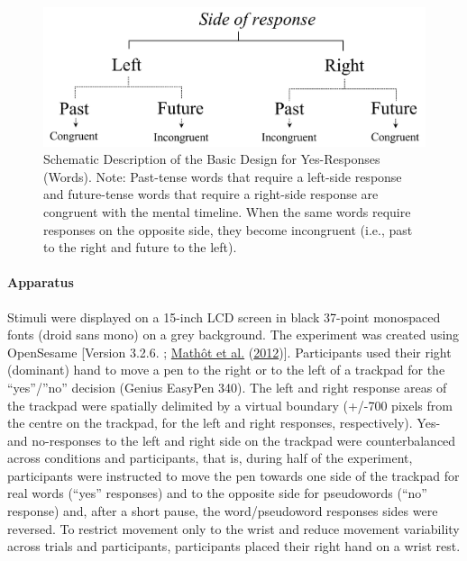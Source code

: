 \documentclass[
  a4paper,12pt,twoside,onecolumn,openright,final,oldfontcommands]{memoir}
\begin{document}
\begin{figure}[htbp!]

{\centering \includegraphics[width=0.8\linewidth]{figures/chap-3-fig1} 

}

\caption{Schematic Description of the Basic Design for Yes-Responses (Words). Note: Past-tense words that require a left-side response and future-tense words that require a right-side response are congruent with the mental timeline. When the same words require responses on the opposite side, they become incongruent (i.e., past to the right and future to the left).}\label{fig:chap-3-fig1}
\end{figure}

\hypertarget{apparatus}{%
\paragraph{Apparatus}\label{apparatus}}

Stimuli were displayed on a 15-inch LCD screen in black 37-point monospaced fonts (droid sans mono) on a grey background. The experiment was created using OpenSesame {[}Version 3.2.6. ; \protect\hyperlink{ref-mathot_opensesame_2012}{Mathôt et al.} (\protect\hyperlink{ref-mathot_opensesame_2012}{2012}){]}. Participants used their right (dominant) hand to move a pen to the right or to the left of a trackpad for the ``yes''/''no'' decision (Genius EasyPen 340). The left and right response areas of the trackpad were spatially delimited by a virtual boundary (+/-700 pixels from the centre on the trackpad, for the left and right responses, respectively). Yes- and no-responses to the left and right side on the trackpad were counterbalanced across conditions and participants, that is, during half of the experiment, participants were instructed to move the pen towards one side of the trackpad for real words (``yes'' responses) and to the opposite side for pseudowords (``no'' response) and, after a short pause, the word/pseudoword responses sides were reversed. To restrict movement only to the wrist and reduce movement variability across trials and participants, participants placed their right hand on a wrist rest.
\end{document}
